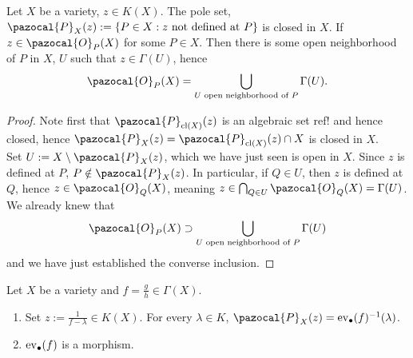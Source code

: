     \begin{lemma}
        Let $X$ be a variety, $z\in K(X)$. The pole set, $\pazocal{P}_X(z):= \{P \in X: z \text{ not defined at }P\}$ is closed in $X$. If $z\in \pazocal{O}_P(X)$ for some $P\in X$. Then there is some open neighborhood of $P$ in $X$, $U$ such that $z\in\Gamma(U)$, hence 
        $$\pazocal{O}_P(X)=\bigcup_{U\text{ open neighborhood of } P} \Gamma(U).$$
    \end{lemma}
    \begin{proof}
        Note first that $\pazocal{P}_{\cl(X)}(z)$ is an algebraic set {\Large ref!} and hence closed, hence $\pazocal{P}_{X}(z)=\pazocal{P}_{\cl(X)}(z)\cap X$ is closed in $X$.\\
        Set $U:= X\setminus \pazocal{P}_X(z)$, which we have just seen is open in $X$. Since $z$ is defined at $P$, $P\notin \pazocal{P}_X(z)$. In particular, if $Q\in U$, then $z$ is defined at $Q$, hence $z\in \pazocal{O}_Q(X)$, meaning $z\in \bigcap_{Q\in U} \pazocal{O}_Q(X)=\Gamma(U)$. We already knew that 
        $$\pazocal{O}_P(X)\supset \bigcup_{U\text{ open neighborhood of } P} \Gamma(U)$$
        and we have just established the converse inclusion. 
    \end{proof}
    \begin{lemma}
        Let $X$ be a variety and $f=\frac{g}{h}\in \Gamma(X)$.
        \begin{enumerate}
            \item Set $z:= \frac{1}{f-\lambda}\in K(X)$. For every $\lambda\in K$, $\pazocal{P}_X(z)=\ev_\bullet(f)^{-1}(\lambda)$.
            \item $\mathrm{ev}_\bullet(f)$ is a morphism.
        \end{enumerate}
    \end{lemma}

